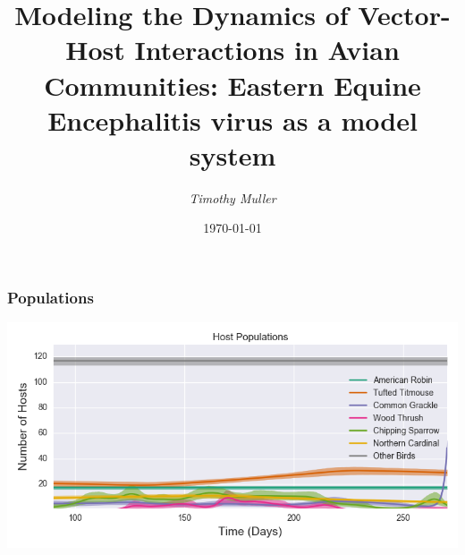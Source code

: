 \documentclass{beamer}
\title[Vector-Host Dynamics]{Modeling the Dynamics of Vector-Host Interactions in Avian Communities: Eastern Equine Encephalitis virus as a model system} %
\author[Tim Muller]{\emph{Timothy Muller}}
\institute[ORST] %
{
Oregon State University \\ %
Medlock Lab \\
\medskip
\textit{mullert@onid.orst.edu} %
}
\date{\today} %
\begin{document}
\begin{frame}
\titlepage %
\end{frame}





\begin{frame}
\frametitle{Populations}
\includegraphics[width=\linewidth]{total_populations.png}
\end{frame}
\end{document}
